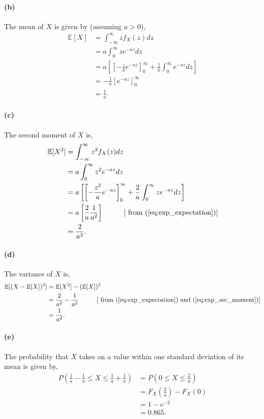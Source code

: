 \paragraph{(b)} The mean of $X$ is given by (assuming $a > 0$),
\begin{align}\label{eq:exp_expectation}
	\mathbb{E}[X] &= \int_{-\infty}^{\infty} z f_X(z)dz \nonumber\\
	&= a\int_{0}^{\infty} z e^{-az}dz \nonumber\\
	&= a\left[\left[-\frac{z}{a}e^{-az}\right]_0^{\infty}+\frac{1}{a}\int_{0}^{\infty}e^{-az}dz\right] \nonumber\\
	&= -\frac{1}{a}\left[e^{-az}\right]_0^{\infty} \nonumber\\
	&= \frac{1}{a}.
\end{align}
\paragraph{(c)} The second moment of $X$ is,
\begin{align}\label{eq:exp_sec_moment}
	\mathbb{E}[X^2] &= \int_{-\infty}^{\infty}z^2f_X(z)dz \nonumber\\
	&= a\int_{0}^{\infty}z^2e^{-az}dz \nonumber\\
	&= a \left[\left[-\frac{z^2}{a}e^{-az}\right]_0^{\infty}+\frac{2}{a}\int_{0}^{\infty}ze^{-az}dz\right] \nonumber\\
	&= a\left[\frac{2}{a}\frac{1}{a^2}\right] \hspace*{1cm}[\text{ from }(\ref{eq:exp_expectation})] \nonumber\\
	&= \frac{2}{a^2}.
\end{align}
\paragraph{(d)}The variance of $X$ is,
\begin{align}\label{eq:exp_var}
	\mathbb{E}[(X-\mathbb{E}[X])^2] &= \mathbb{E}[X^2]-(\mathbb{E}[X])^2 \nonumber\\
	&= \frac{2}{a^2} - \frac{1}{a^2}\hspace*{1cm}[\text{ from }(\ref{eq:exp_expectation}) \text{ and }(\ref{eq:exp_sec_moment})]\\
	&= \frac{1}{a^2}.
\end{align}
\paragraph{(e)} The probability that $X$ takes on a value within one standard deviation of its mean is given by,
\begin{align*}
	P(\frac{1}{a}-\frac{1}{a} \leq X \leq \frac{1}{a}+\frac{1}{a}) &= P(0 \leq X \leq \frac{2}{a})\\
	&= F_X\left(\frac{2}{a}\right)-F_X(0)\\
	&= 1-e^{-2}\\
	&= 0.865.
\end{align*}